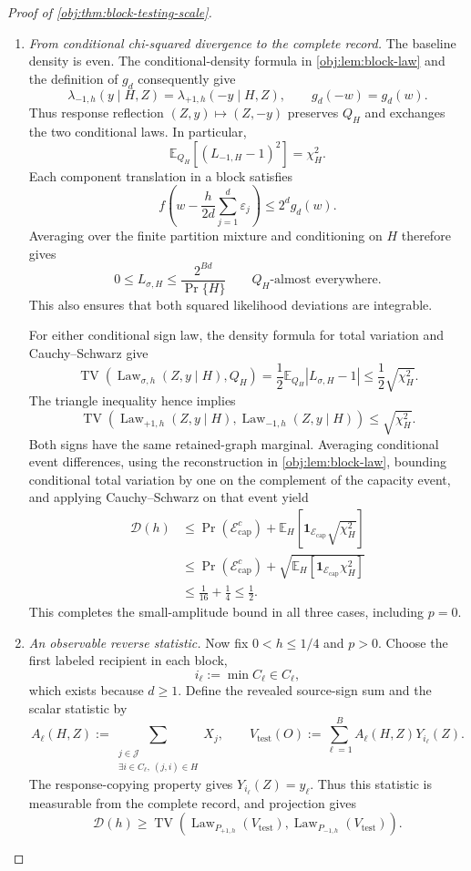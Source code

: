 \begin{proof}[Proof of \cref{obj:thm:block-testing-scale}]
\begin{enumerate}
\item \textit{From conditional chi-squared divergence to the complete record.}
The baseline density is even. The conditional-density formula in
\cref{obj:lem:block-law} and the definition of \(g_d\) consequently give
\[
\lambda_{-1,h}(y\mid H,Z)
=
\lambda_{+1,h}(-y\mid H,Z),
\qquad
g_d(-w)=g_d(w).
\]
Thus response reflection \((Z,y)\mapsto(Z,-y)\) preserves \(Q_H\) and exchanges the two conditional laws. In particular,
\[
\mathbb E_{Q_H}[(L_{-1,H}-1)^2]=\chi_H^2.
\]
Each component translation in a block satisfies
\[
f\!\left(w-\frac h{2d}\sum_{j=1}^{d}\varepsilon_j\right)
\le2^d g_d(w).
\]
Averaging over the finite partition mixture and conditioning on \(H\) therefore gives
\[
0\le L_{\sigma,H}\le\frac{2^{Bd}}{\Pr\{H\}}
\qquad Q_H\text{-almost everywhere}.
\]
This also ensures that both squared likelihood deviations are integrable.

For either conditional sign law, the density formula for total variation and Cauchy--Schwarz give
\[
\operatorname{TV}\!\left(
\operatorname{Law}_{\sigma,h}(Z,y\mid H),Q_H
\right)
=
\frac12\mathbb E_{Q_H}|L_{\sigma,H}-1|
\le\frac12\sqrt{\chi_H^2}.
\]
The triangle inequality hence implies
\[
\operatorname{TV}\!\left(
\operatorname{Law}_{+1,h}(Z,y\mid H),
\operatorname{Law}_{-1,h}(Z,y\mid H)
\right)
\le\sqrt{\chi_H^2}.
\]
Both signs have the same retained-graph marginal. Averaging conditional event differences, using the reconstruction in
\cref{obj:lem:block-law}, bounding conditional total variation by one on the complement of the capacity event, and applying Cauchy--Schwarz on that event yield
\[
\begin{aligned}
\mathcal D(h)
&\le
\Pr(\mathcal E_{\mathrm{cap}}^c)
+
\mathbb E_H[
\mathbf1_{\mathcal E_{\mathrm{cap}}}\sqrt{\chi_H^2}]\\
&\le
\Pr(\mathcal E_{\mathrm{cap}}^c)
+
\sqrt{\mathbb E_H[
\mathbf1_{\mathcal E_{\mathrm{cap}}}\chi_H^2]}\\
&\le\frac1{16}+\frac14
\le\frac12.
\end{aligned}
\]
This completes the small-amplitude bound in all three cases, including \(p=0\).

\item \textit{An observable reverse statistic.}
Now fix \(0<h\le1/4\) and \(p>0\). Choose the first labeled recipient in each block,
\[
i_\ell:=\min C_\ell\in C_\ell,
\]
which exists because \(d\ge1\). Define the revealed source-sign sum and the scalar statistic by
\[
A_\ell(H,Z):=
\sum_{\substack{j\in\mathcal J\\
\exists i\in C_\ell,\ (j,i)\in H}}X_j,
\qquad
V_{\mathrm{test}}(O):=
\sum_{\ell=1}^{B}A_\ell(H,Z)Y_{i_\ell}(Z).
\]
The response-copying property gives \(Y_{i_\ell}(Z)=y_\ell\). Thus this statistic is measurable from the complete record, and projection gives
\[
\mathcal D(h)\ge
\operatorname{TV}\!\left(
\operatorname{Law}_{P_{+1,h}}(V_{\mathrm{test}}),
\operatorname{Law}_{P_{-1,h}}(V_{\mathrm{test}})
\right).
\]


\end{enumerate}
\end{proof}
